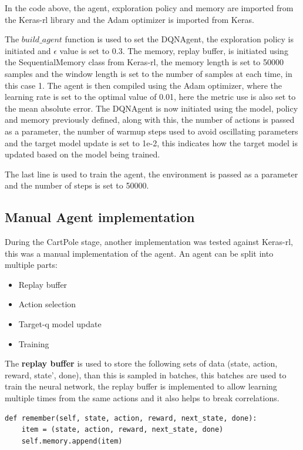 In the code above, the agent, exploration policy and memory are imported from the Keras-rl library and the Adam optimizer is imported from Keras.

The $build\_agent$ function is used to set the DQNAgent, the exploration policy is initiated and $\epsilon$ value is set to 0.3.
The memory, replay buffer, is initiated using the SequentialMemory class from Keras-rl, the memory length is set to 50000 samples and the window length is set to the number of samples at each time, in this case 1.
The agent is then compiled using the Adam optimizer, where the learning rate is set to the optimal value of 0.01, here the metric use is also set to the mean absolute error.
The DQNAgent is now initiated using the model, policy and memory previously defined, along with this, the number of actions is passed as a parameter, the number of warmup steps used to avoid oscillating parameters and the target model update is set to 1e-2, this indicates how the target model is updated based on the model being trained.

The last line is used to train the agent, the environment is passed as a parameter and the number of steps is set to 50000.

\subsection*{Manual Agent implementation}
During the CartPole stage, another implementation was tested against Keras-rl, this was a manual implementation of the agent.
An agent can be split into multiple parts:
\begin{itemize}
    \item Replay buffer
    \item Action selection
    \item Target-q model update
    \item Training
\end{itemize}

The \textbf{replay buffer} is used to store the following sets of data (state, action, reward, state', done), than this is sampled in batches, this batches are used to train the neural network, the replay buffer is implemented to allow learning multiple times from the same actions and it also helps to break correlations.
\lstset{language=Python}
\lstset{frame=lines}
\lstset{basicstyle=\footnotesize}
\begin{lstlisting}
def remember(self, state, action, reward, next_state, done):
    item = (state, action, reward, next_state, done)
    self.memory.append(item)
\end{lstlisting}


